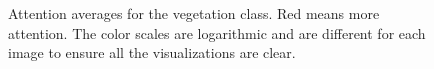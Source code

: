 \begin{figure}[ht]
{	}
	\caption[Vegetation attention averages]{
		Attention averages for the vegetation class. Red means more attention. The color
		scales are logarithmic and are different for each image to ensure all the visualizations
		are clear.
		}
\end{figure}
\label{fig:average_vegetations}
